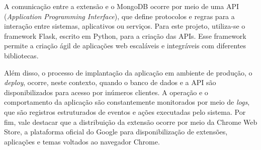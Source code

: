 A comunicação entre a extensão e o MongoDB ocorre por meio de uma API (\textit{Application Programming Interface}), que define protocolos e regras para a interação entre sistemas, aplicativos ou serviços. Para este projeto, utiliza-se o framework Flask, escrito em Python, para a criação das APIs. Esse framework permite a criação ágil de aplicações web escaláveis e integráveis com diferentes bibliotecas.

Além disso, o processo de implantação da aplicação em ambiente de produção, o \textit{deploy}, ocorre, neste contexto, quando o banco de dados e a API são disponibilizados para acesso por inúmeros clientes. A operação e o comportamento da aplicação são constantemente monitorados por meio de \textit{logs}, que são registros estruturados de eventos e ações executadas pelo sistema. Por fim, vale destacar que a distribuição da extensão ocorre por meio da Chrome Web Store, a plataforma oficial do Google para disponibilização de extensões, aplicações e temas voltados ao navegador Chrome.